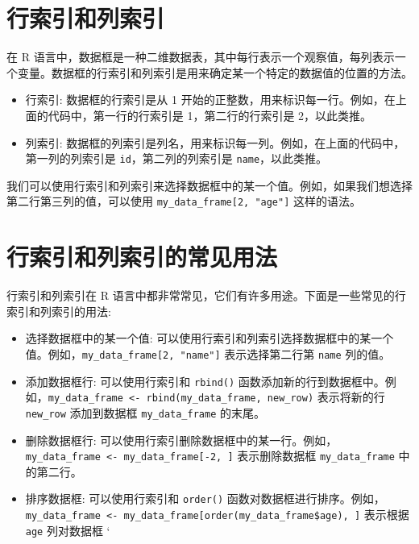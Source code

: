 \documentclass[
  letterpaper,
  DIV=11,
  numbers=noendperiod]{scrreprt}
\providecommand{\tightlist}{%
  \setlength{\itemsep}{0pt}\setlength{\parskip}{0pt}}\usepackage{longtable,booktabs,array}
\begin{document}
\section{行索引和列索引}\label{ux884cux7d22ux5f15ux548cux5217ux7d22ux5f15}

在 R
语言中，数据框是一种二维数据表，其中每行表示一个观察值，每列表示一个变量。数据框的行索引和列索引是用来确定某一个特定的数据值的位置的方法。

\begin{itemize}
\tightlist
\item
  行索引: 数据框的行索引是从 1
  开始的正整数，用来标识每一行。例如，在上面的代码中，第一行的行索引是
  1，第二行的行索引是 2，以此类推。
\item
  列索引:
  数据框的列索引是列名，用来标识每一列。例如，在上面的代码中，第一列的列索引是
  \texttt{id}，第二列的列索引是 \texttt{name}，以此类推。
\end{itemize}

我们可以使用行索引和列索引来选择数据框中的某一个值。例如，如果我们想选择第二行第三列的值，可以使用
\texttt{my\_data\_frame{[}2,\ "age"{]}} 这样的语法。

\section{行索引和列索引的常见用法}\label{ux884cux7d22ux5f15ux548cux5217ux7d22ux5f15ux7684ux5e38ux89c1ux7528ux6cd5}

行索引和列索引在 R
语言中都非常常见，它们有许多用途。下面是一些常见的行索引和列索引的用法:

\begin{itemize}
\tightlist
\item
  选择数据框中的某一个值:
  可以使用行索引和列索引选择数据框中的某一个值。例如，\texttt{my\_data\_frame{[}2,\ "name"{]}}
  表示选择第二行第 \texttt{name} 列的值。
\item
  添加数据框行: 可以使用行索引和 \texttt{rbind()}
  函数添加新的行到数据框中。例如，\texttt{my\_data\_frame\ \textless{}-\ rbind(my\_data\_frame,\ new\_row)}
  表示将新的行 \texttt{new\_row} 添加到数据框 \texttt{my\_data\_frame}
  的末尾。
\item
  删除数据框行:
  可以使用行索引删除数据框中的某一行。例如，\texttt{my\_data\_frame\ \textless{}-\ my\_data\_frame{[}-2,\ {]}}
  表示删除数据框 \texttt{my\_data\_frame} 中的第二行。
\item
  排序数据框: 可以使用行索引和 \texttt{order()}
  函数对数据框进行排序。例如，\texttt{my\_data\_frame\ \textless{}-\ my\_data\_frame{[}order(my\_data\_frame\$age),\ {]}}
  表示根据 \texttt{age} 列对数据框 `
\end{itemize}
\end{document}
